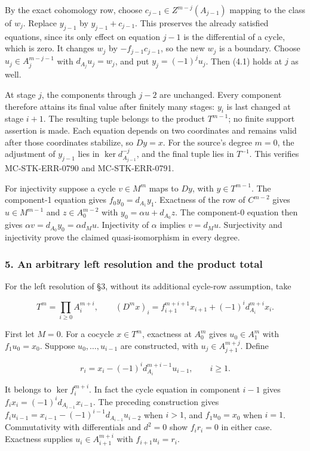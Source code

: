\documentclass[11pt]{article}
\begin{document}
By the exact cohomology row, choose \(c_{j-1}\in Z^{m-j}(A_{j-1})\) mapping to the class of \(w_j\). Replace \(y_{j-1}\) by \(y_{j-1}+c_{j-1}\). This preserves the already satisfied equations, since its only effect on equation \(j-1\) is the differential of a cycle, which is zero. It changes \(w_j\) by \(-f_{j-1}c_{j-1}\), so the new \(w_j\) is a boundary. Choose \(u_j\in A_j^{m-j-1}\) with \(d_{A_j}u_j=w_j\), and put \(y_j=(-1)^j u_j\). Then (4.1) holds at \(j\) as well.

At stage \(j\), the components through \(j-2\) are unchanged. Every component therefore attains its final value after finitely many stages: \(y_i\) is last changed at stage \(i+1\). The resulting tuple belongs to the product \(T^{m-1}\); no finite support assertion is made. Each equation depends on two coordinates and remains valid after those coordinates stabilize, so \(Dy=x\). For the source's degree \(m=0\), the adjustment of \(y_{j-1}\) lies in \(\ker d^{-j}_{A_{j-1}}\), and the final tuple lies in \(T^{-1}\). This verifies MC-STK-ERR-0790 and MC-STK-ERR-0791.

For injectivity suppose a cycle \(v\in M^m\) maps to \(Dy\), with \(y\in T^{m-1}\). The component-1 equation gives \(f_0y_0=d_{A_1}y_1\). Exactness of the row of \(C^{m-2}\) gives \(u\in M^{m-1}\) and \(z\in A_0^{m-2}\) with \(y_0=\alpha u+d_{A_0}z\). The component-0 equation then gives \(\alpha v=d_{A_0}y_0=\alpha d_Mu\). Injectivity of \(\alpha\) implies \(v=d_Mu\). Surjectivity and injectivity prove the claimed quasi-isomorphism in every degree.

\subsubsection{5. An arbitrary left resolution and the product total}\label{an-arbitrary-left-resolution-and-the-product-total}

For the left resolution of §3, without its additional cycle-row assumption, take

\[
T^m=\prod_{i\geq0}A_i^{m+i},\qquad
(D^mx)_i=f_{i+1}^{m+i+1}x_{i+1}+(-1)^i d_{A_i}^{m+i}x_i.       \tag{5.1}
\]

First let \(M=0\). For a cocycle \(x\in T^m\), exactness at \(A_0^m\) gives \(u_0\in A_1^m\) with \(f_1u_0=x_0\). Suppose \(u_0,\ldots,u_{i-1}\) are constructed, with \(u_j\in A_{j+1}^{m+j}\). Define

\[
r_i=x_i-(-1)^i d_{A_i}^{m+i-1}u_{i-1},\qquad i\geq1.
\]

It belongs to \(\ker f_i^{m+i}\). In fact the cycle equation in component \(i-1\) gives \(f_ix_i=(-1)^i d_{A_{i-1}}x_{i-1}\). The preceding construction gives \(f_iu_{i-1}=x_{i-1}-(-1)^{i-1}d_{A_{i-1}}u_{i-2}\) when \(i>1\), and \(f_1u_0=x_0\) when \(i=1\). Commutativity with differentials and \(d^2=0\) show \(f_ir_i=0\) in either case. Exactness supplies \(u_i\in A_{i+1}^{m+i}\) with \(f_{i+1}u_i=r_i\).
\end{document}
